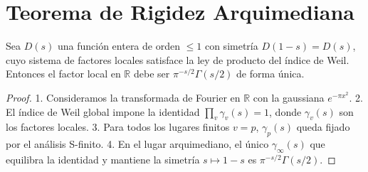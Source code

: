 \section{Teorema de Rigidez Arquimediana}

\begin{theorem}
Sea $D(s)$ una función entera de orden $\leq 1$ con simetría $D(1-s)=D(s)$,
cuyo sistema de factores locales satisface la ley de producto del índice de Weil.
Entonces el factor local en $\mathbb{R}$ debe ser 
$\pi^{-s/2}\Gamma(s/2)$ de forma única.
\end{theorem}

\begin{proof}
1. Consideramos la transformada de Fourier en $\mathbb{R}$ con la gaussiana $e^{-\pi x^2}$.
2. El índice de Weil global impone la identidad $\prod_v \gamma_v(s) = 1$,
   donde $\gamma_v(s)$ son los factores locales.
3. Para todos los lugares finitos $v=p$, $\gamma_p(s)$ queda fijado por el análisis S-finito.
4. En el lugar arquimediano, el único $\gamma_\infty(s)$ que equilibra la identidad
   y mantiene la simetría $s\mapsto 1-s$ es $\pi^{-s/2}\Gamma(s/2)$.
\end{proof}
